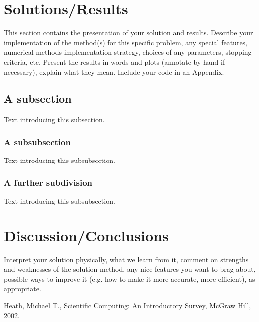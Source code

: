 \documentclass[11pt]{article}
\begin{document}
\section{Solutions/Results}\label{S:4}
This section contains the presentation of your solution and results.
Describe your implementation of the method(s) for this specific problem, any 
special features, numerical methods implementation  strategy, choices of any 
parameters, stopping criteria, etc.
Present the results in words and plots (annotate by hand if necessary), explain 
what they mean. Include your code in an Appendix. 
\subsection{A subsection}
%
Text introducing this subsection. 
\subsubsection{A subsubsection}
%
Text introducing this subsubsection. 
\subsubsection{A further subdivision}
%
Text introducing this subsubsection. 
\section{Discussion/Conclusions}\label{S:5}
Interpret your solution physically, what we learn from it, comment on strengths and
weaknesses of the solution method, any nice features you want to brag about, 
possible ways to improve it (e.g. how to make it more accurate, more efficient), as
appropriate.
\begin{thebibliography}{100}
Heath, Michael T., Scientific Computing: An Introductory Survey, McGraw Hill, 2002.
%
%
\end{thebibliography}
\newpage
\appendix 
\setcounter{section}{0}           
\end{document}
